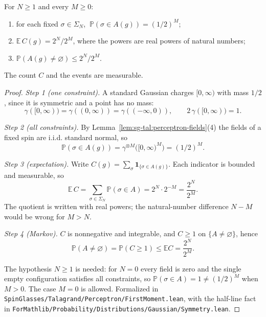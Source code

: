 \begin{theorem}\label{thm:sg-tal:perceptron-first-moment}
  \leanok
{}
For $N\ge1$ and every $M\ge0$:
\begin{enumerate}
\item for each fixed $\sigma\in\Sigma_N$, $\ \mathbb P(\sigma\in A(g))=(1/2)^M$;
\item $\mathbb E\,C(g)=2^N/2^M$, where the powers are real powers of natural numbers;
\item $\mathbb P(A(g)\ne\varnothing)\le 2^N/2^M$.
\end{enumerate}
The count $C$ and the events are measurable.
\end{theorem}
\begin{proof}
  \leanok
\emph{Step 1 (one constraint).} A standard Gaussian charges $[0,\infty)$ with mass $1/2$, since it is
symmetric and a point has no mass:
\[
\gamma([0,\infty))=\gamma((0,\infty))=\gamma((-\infty,0)),\qquad 2\,\gamma([0,\infty))=1.
\]

\emph{Step 2 (all constraints).} By Lemma~\ref{lem:sg-tal:perceptron-fields}(4) the fields of a fixed spin are
i.i.d. standard normal, so
\[
\mathbb P(\sigma\in A(g))=\gamma^{\otimes M}\bigl([0,\infty)^M\bigr)=(1/2)^M.
\]

\emph{Step 3 (expectation).} Write $C(g)=\sum_{\sigma}\mathbf 1_{\{\sigma\in A(g)\}}$. Each indicator is
bounded and measurable, so
\[
\mathbb E\,C=\sum_{\sigma\in\Sigma_N}\mathbb P(\sigma\in A)=2^N\cdot 2^{-M}=\frac{2^N}{2^M}.
\]
The quotient is written with real powers; the natural-number difference $N-M$ would be wrong for $M>N$.

\emph{Step 4 (Markov).} $C$ is nonnegative and integrable, and $C\ge1$ on $\{A\ne\varnothing\}$, hence
\[
 \mathbb P(A\ne\varnothing)=\mathbb P(C\ge1)\le\mathbb E C=\frac{2^N}{2^M}.
\]

The hypothesis $N\ge1$ is needed: for $N=0$ every field is zero and the single empty configuration satisfies all
constraints, so $\mathbb P(\sigma\in A)=1\ne(1/2)^M$ when $M>0$. The case $M=0$ is allowed.
Formalized in \texttt{SpinGlasses/Talagrand/Perceptron/FirstMoment.lean}, with the half-line fact in
\texttt{ForMathlib/Probability/Distributions/Gaussian/Symmetry.lean}.
\end{proof}

